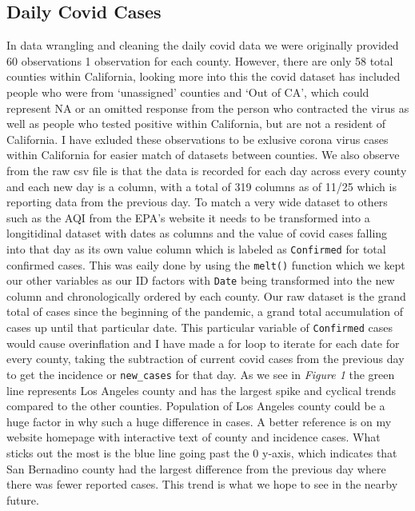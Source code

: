 \documentclass[
]{article}
\begin{document}
\hypertarget{daily-covid-cases}{%
\subsection{Daily Covid Cases}\label{daily-covid-cases}}

In data wrangling and cleaning the daily covid data we were originally
provided 60 observations 1 observation for each county. However, there
are only 58 total counties within California, looking more into this the
covid dataset has included people who were from `unassigned' counties
and `Out of CA', which could represent NA or an omitted response from
the person who contracted the virus as well as people who tested
positive within California, but are not a resident of California. I have
exluded these observations to be exlusive corona virus cases within
California for easier match of datasets between counties. We also
observe from the raw csv file is that the data is recorded for each day
across every county and each new day is a column, with a total of 319
columns as of 11/25 which is reporting data from the previous day. To
match a very wide dataset to others such as the AQI from the EPA's
website it needs to be transformed into a longitidinal dataset with
dates as columns and the value of covid cases falling into that day as
its own value column which is labeled as \texttt{Confirmed} for total
confirmed cases. This was eaily done by using the \texttt{melt()}
function which we kept our other variables as our ID factors with
\texttt{Date} being transformed into the new column and chronologically
ordered by each county. Our raw dataset is the grand total of cases
since the beginning of the pandemic, a grand total accumulation of cases
up until that particular date. This particular variable of
\texttt{Confirmed} cases would cause overinflation and I have made a for
loop to iterate for each date for every county, taking the subtraction
of current covid cases from the previous day to get the incidence or
\texttt{new\_cases} for that day. As we see in \emph{Figure 1} the green
line represents Los Angeles county and has the largest spike and
cyclical trends compared to the other counties. Population of Los
Angeles county could be a huge factor in why such a huge difference in
cases. A better reference is on my website homepage with interactive
text of county and incidence cases. What sticks out the most is the blue
line going past the 0 y-axis, which indicates that San Bernadino county
had the largest difference from the previous day where there was fewer
reported cases. This trend is what we hope to see in the nearby future.
\end{document}
